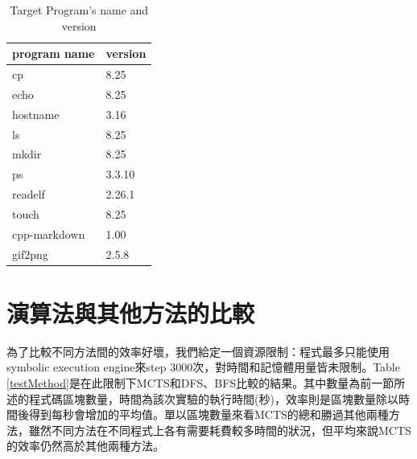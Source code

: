 \documentclass[12pt,a4paper,oneside]{book}
\begin{document}
\newcommand{\ra}[1]{\renewcommand{\arraystretch}{#1}}
\begin{table}[htbp]\centering
\caption{Target Program's name and version}
\label{binarys}
\begin{tabular}{@{}ll@{}}\toprule
program name & version \\ \midrule
cp           & 8.25    \\ 
echo         & 8.25    \\ 
hostname     & 3.16    \\ 
ls           & 8.25    \\ 
mkdir        & 8.25    \\ 
ps           & 3.3.10  \\ 
readelf      & 2.26.1  \\ 
touch        & 8.25    \\ 
cpp-markdown & 1.00    \\ 
gif2png      & 2.5.8   \\ \bottomrule
\end{tabular}
\end{table}

\section{演算法與其他方法的比較}

為了比較不同方法間的效率好壞，我們給定一個資源限制：程式最多只能使用symbolic execution engine來step 3000次，對時間和記憶體用量皆未限制。Table \ref{testMethod}是在此限制下MCTS和DFS、BFS比較的結果。其中數量為前一節所述的程式碼區塊數量，時間為該次實驗的執行時間(秒)，效率則是區塊數量除以時間後得到每秒會增加的平均值。單以區塊數量來看MCTS的總和勝過其他兩種方法，雖然不同方法在不同程式上各有需要耗費較多時間的狀況，但平均來說MCTS的效率仍然高於其他兩種方法。
\end{document}
